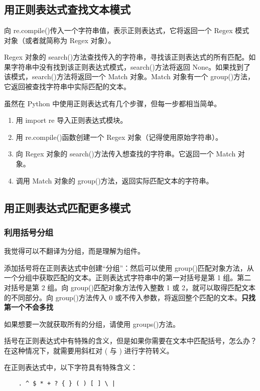 \chapter{}
\section{用正则表达式查找文本模式}
向 re.compile()传入一个字符串值，表示正则表达式，它将返回一个 Regex 模式
对象（或者就简称为 Regex 对象）。

Regex 对象的 search()方法查找传入的字符串，寻找该正则表达式的所有匹配。如果字符串中没有找到该正则表达式模式，search()方法将返回 None。如果找到了该模式，search()方法将返回一个 Match 对象。Match 对象有一个 group()方法，它返回被查找字符串中实际匹配的文本。


虽然在 Python 中使用正则表达式有几个步骤，但每一步都相当简单。
\begin{enumerate}
    \item 用 import re 导入正则表达式模块。
    \item 用 re.compile()函数创建一个 Regex 对象（记得使用原始字符串）。
    \item 向 Regex 对象的 search()方法传入想查找的字符串。它返回一个 Match 对象。
    \item 调用 Match 对象的 group()方法，返回实际匹配文本的字符串。
\end{enumerate}
\section{用正则表达式匹配更多模式}
\subsection{利用括号分组}
\begin{tcolorbox}
    我觉得可以不翻译为分组，而是理解为组件。
\end{tcolorbox}
添加括号将在正则表达式中创建“分组”：然后可以使用 group()匹配对象方法，从一个分组中获取匹配的文本。正则表达式字符串中的第一对括号是第 1 组。第二对括号是第 2 组。向 group()匹配对象方法传入整数 1 或 2，就可以取得匹配文本的不同部分。向 group()方法传入 0 或不传入参数，将返回整个匹配的文本。\textbf{只找第一个不会多找}

如果想要一次就获取所有的分组，请使用 groups()方法。

括号在正则表达式中有特殊的含义，但是如果你需要在文本中匹配括号，怎么办？在这种情况下，就需要用斜杠对 ( 与 ) 进行字符转义。

在正则表达式中，以下字符具有特殊含义：
\begin{verbatim}
    . ^ $ * + ? { } ( ) [ ] \ |
\end{verbatim}

